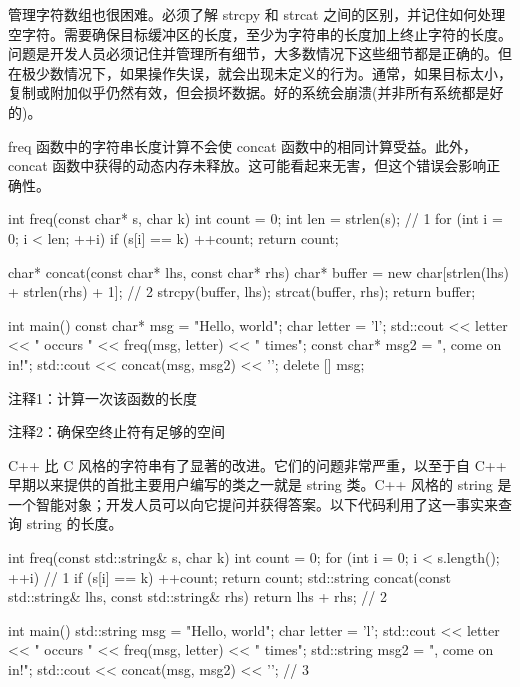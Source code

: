 管理字符数组也很困难。必须了解 strcpy 和 strcat 之间的区别，并记住如何处理空字符。需要确保目标缓冲区的长度，至少为字符串的长度加上终止字符的长度。问题是开发人员必须记住并管理所有细节，大多数情况下这些细节都是正确的。但在极少数情况下，如果操作失误，就会出现未定义的行为。通常，如果目标太小，复制或附加似乎仍然有效，但会损坏数据。好的系统会崩溃(并非所有系统都是好的)。

freq 函数中的字符串长度计算不会使 concat 函数中的相同计算受益。此外，concat 函数中获得的动态内存未释放。这可能看起来无害，但这个错误会影响正确性。


\begin{cpp}
int freq(const char* s, char k) {
  int count = 0;
  int len = strlen(s); // 1
  for (int i = 0; i < len; ++i)
    if (s[i] == k)
      ++count;
  return count;
}

char* concat(const char* lhs, const char* rhs) {
  char* buffer = new char[strlen(lhs) + strlen(rhs) + 1]; // 2
  strcpy(buffer, lhs);
  strcat(buffer, rhs);
  return buffer;
}

int main() {
  const char* msg = "Hello, world";
  char letter = 'l';
  std::cout << letter << " occurs " << freq(msg, letter) << " times\n";
  const char* msg2 = ", come on in!";
  std::cout << concat(msg, msg2) << '\n';
  delete [] msg;
}
\end{cpp}

{\footnotesize
注释1：计算一次该函数的长度

注释2：确保空终止符有足够的空间
}


C++ 比 C 风格的字符串有了显著的改进。它们的问题非常严重，以至于自 C++ 早期以来提供的首批主要用户编写的类之一就是 string 类。C++ 风格的 string 是一个智能对象；开发人员可以向它提问并获得答案。以下代码利用了这一事实来查询 string 的长度。


\begin{cpp}
int freq(const std::string& s, char k) {
  int count = 0;
  for (int i = 0; i < s.length(); ++i) // 1
    if (s[i] == k)
      ++count;
  return count;
}
std::string concat(const std::string& lhs, const std::string& rhs) {
  return lhs + rhs; // 2
}

int main() {
  std::string msg = "Hello, world";
  char letter = 'l';
  std::cout << letter << " occurs " << freq(msg, letter) << " times\n";
  std::string msg2 = ", come on in!";
  std::cout << concat(msg, msg2) << '\n'; // 3
}
\end{cpp}


